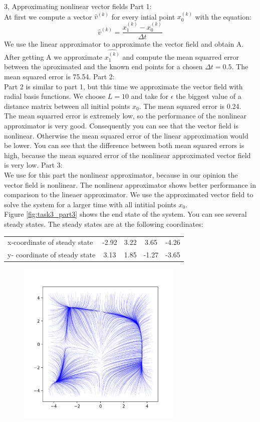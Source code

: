 \documentclass[10pt,a4paper]{article}
\begin{document}
\begin{task}{3, Approximating nonlinear vector fields}
Part 1: \\
At first we compute a vector $\hat{v}^{(k)}$ for every intial point $x_0^{(k)}$ with the equation:
\begin{equation*}
\hat{v}^{(k)} = \frac{x_1^{(k)} -x_0^{(k)}}{\Delta t}
\end{equation*}
We use the linear approximator to approximate the vector field and obtain A. After getting A we approximate $\hat{x_1^{(k)}}$ and compute the mean squarred error between the aproximated and the known end points for a chosen $\Delta t = 0.5$.
The mean squared error is 75.54.\bigbreak
Part 2: \\
Part 2 is similar to part 1, but this time we approximate the vector field with radial basis functions. We choose $L=10$ and take  for $\epsilon$ the biggest value of a distance matrix between all initial points $x_0$.
The mean squared error is 0.24. \\
The mean squarred error is extremely low, so the performance of the nonlinear approximator is very good. Consequently you can see that the vector field is nonlinear. Otherwise the mean squared error of the linear approximation would be lower.
You can see that the difference between both mean squared errors is high, because the mean squared error of the nonlinear approximated vector field is very low. \bigbreak
Part 3: \\
We use for this part the nonlinear approximator, because in our opinion the vector field is nonlinear. The nonlinear approximator shows better performance in comparison to the lineaer approximator. We use the approximated vector field to solve  the system for a larger time with all intitial points $x_0$.\\
Figure \ref{fig:task3_part3} shows the end state of the system. You can see several steady states. The steady states are at the following coordinates: \bigbreak
\begin{tabular}{|l|c|c|c|c|}
\hline
x-coordinate of steady state& -2.92&3.22&3.65&-4.26\\
y- coordinate of steady state& 3.13&1.85&-1.27&-3.65\\
\hline
\end{tabular}
\begin{figure}[H]
\centering
\includegraphics[width=0.7\textwidth]{../plots/task3_part3.png}

\end{figure}
\end{task}
\end{document}
